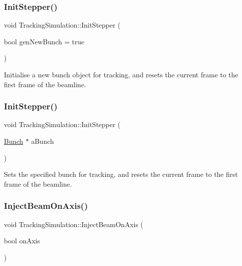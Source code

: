\subsubsection{\texorpdfstring{Init\+Stepper()}{InitStepper()}\hspace{0.1cm}{\footnotesize\ttfamily [1/2]}}
{\footnotesize\ttfamily void Tracking\+Simulation\+::\+Init\+Stepper (\begin{DoxyParamCaption}\item[{bool}]{gen\+New\+Bunch = {\ttfamily true} }\end{DoxyParamCaption})}

Initialise a new bunch object for tracking, and resets the current frame to the first frame of the beamline. \mbox{\label{classTrackingSimulation_ab7456d24ba873db3a5b7d61912d1f551}} 
\subsubsection{\texorpdfstring{Init\+Stepper()}{InitStepper()}\hspace{0.1cm}{\footnotesize\ttfamily [2/2]}}
{\footnotesize\ttfamily void Tracking\+Simulation\+::\+Init\+Stepper (\begin{DoxyParamCaption}\item[{\hyperlink{classBunch}{Bunch} $\ast$}]{a\+Bunch }\end{DoxyParamCaption})}

Sets the specified bunch for tracking, and resets the current frame to the first frame of the beamline. \mbox{\label{classTrackingSimulation_aafcbefd77e9db2baad4d473771f98817}} 
\subsubsection{\texorpdfstring{Inject\+Beam\+On\+Axis()}{InjectBeamOnAxis()}}
{\footnotesize\ttfamily void Tracking\+Simulation\+::\+Inject\+Beam\+On\+Axis (\begin{DoxyParamCaption}\item[{bool}]{on\+Axis }\end{DoxyParamCaption})\hspace{0.3cm}{\ttfamily [inline]}}

